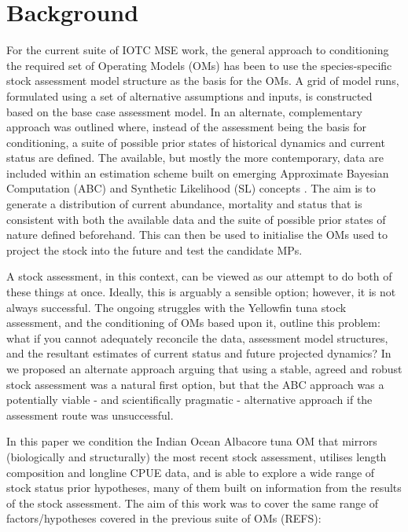 \documentclass[12pt,a4paper,twoside,times,sky,standard]{csiroreport2017}
\begin{document}

\section{Background}

For the current suite of IOTC MSE work, the general approach to conditioning the required set of Operating Models (OMs) has been to use the species-specific stock assessment model structure as the basis for the OMs. A grid of model runs, formulated using a set of alternative assumptions and inputs, is constructed based on the base case assessment model. In \cite{om21} an alternate, complementary approach was outlined where, instead of the assessment being the basis for conditioning, a suite of possible prior states of historical dynamics and current status are defined. The available, but mostly the more contemporary, data are included within an estimation scheme built on emerging Approximate Bayesian Computation (ABC) and Synthetic Likelihood (SL) concepts \cite{abc,synlkhd}. The aim is to generate a distribution of current abundance, mortality and status that is consistent with both the available data and the suite of possible prior states of nature defined beforehand. This can then be used to initialise the OMs used to project the stock into the future and test the candidate MPs.

A stock assessment, in this context, can be viewed as our attempt to do both of these things at once. Ideally, this is arguably a sensible option; however, it is not always successful. The ongoing struggles with the Yellowfin tuna stock assessment, and the conditioning of OMs based upon it, outline this problem: what if you cannot adequately reconcile the data, assessment model structures, and the resultant estimates of current status and future projected dynamics? In \cite{om21} we proposed an alternate approach arguing that using a stable, agreed and robust stock assessment was a natural first option, but that the ABC approach was a potentially viable - and scientifically pragmatic - alternative approach if the assessment route was unsuccessful.

In this paper we condition the Indian Ocean Albacore tuna OM that mirrors (biologically and structurally) the most recent stock assessment, utilises length composition and longline CPUE data, and is able to explore a wide range of stock status prior hypotheses, many of them built on information from the results of the stock assessment. The aim of this work was to cover the
same range of factors/hypotheses covered in the previous suite of OMs (REFS):
\end{document}
